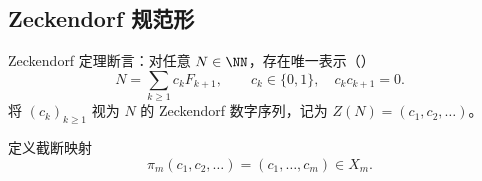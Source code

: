 \subsection{Zeckendorf 规范形}\label{subsec:folding-zeckendorf-canonical}

Zeckendorf 定理断言：对任意 $N\in\NN$，存在唯一表示（\cite{Zeckendorf1972}）
\[
N=\sum_{k\ge1}c_k F_{k+1},\qquad c_k\in\{0,1\},\quad c_kc_{k+1}=0.
\]
将 $(c_k)_{k\ge1}$ 视为 $N$ 的 Zeckendorf 数字序列，记为 $Z(N)=(c_1,c_2,\dots)$。

定义截断映射
\[
\pi_m(c_1,c_2,\dots)=(c_1,\dots,c_m)\in X_m.
\]
